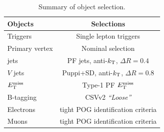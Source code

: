 \begin{table}[!htbp]
  \begin{center}
 {\small
  \begin{tabular} {lc}
\hline
  Objects      & Selections \\
  \hline
Triggers       & Single lepton triggers  \\
Primary vertex & Nominal selection  \\
jets           & PF jets, anti-$k_{\rm T}$, $\Delta R = 0.4$  \\
$V$ jets       & Puppi+SD, anti-$k_{\rm T}$, $\Delta R = 0.8$ \\
$E_\mathrm{T}^{\mathrm{miss}}$         & Type-1 PF $E_\mathrm{T}^{\mathrm{miss}}$\\
B-tagging      & CSVv2 {\em``Loose''}  \\
Electrons      & tight POG identification criteria  \\
Muons          & tight POG identification criteria   \\
  \hline
  \end{tabular}
}
  \caption{Summary of object selection.}
  \label{tab:objects_final}
  \end{center}
\end{table}

